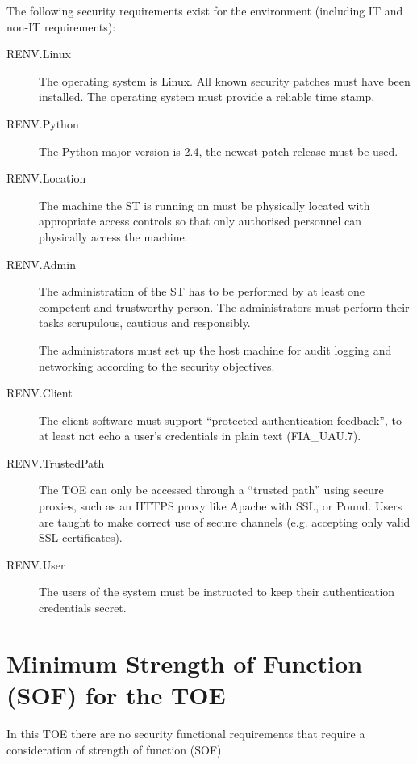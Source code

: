 \documentclass[12pt,english]{scrbook}
\begin{document}
The following security requirements exist for the environment (including IT and
non-IT requirements):

\begin{description}

  \item[RENV.Linux] The operating system is Linux. All known security patches must have
    been installed. The operating system must provide a reliable time stamp.

  \item[RENV.Python] The Python major version is 2.4, the newest patch release must be
      used.

  \item[RENV.Location] The machine the ST is running on must be physically
      located with appropriate access controls so that only authorised
      personnel can physically access the machine.

  \item[RENV.Admin] The administration of the ST has to be performed by at
      least one competent and trustworthy person. The administrators must
      perform their tasks scrupulous, cautious and responsibly.

      The administrators must set up the host machine for audit logging and
      networking according to the security objectives.

  \item[RENV.Client] The client software must support ``protected authentication feedback'',
      to at least not echo a user's credentials in plain text (FIA{\_}UAU.7).

  \item[RENV.TrustedPath] The TOE can only be accessed through a ``trusted path'' using secure
      proxies, such as an HTTPS proxy like Apache with SSL, or Pound. Users are
      taught to make correct use of secure channels (e.g. accepting only valid
      SSL certificates). 

  \item[RENV.User] The users of the system must be instructed to keep their
      authentication credentials secret.

\end{description}

\section{Minimum Strength of Function (SOF) for the TOE}

In this TOE there are no security functional requirements that require a
consideration of strength of function (SOF).
\end{document}

